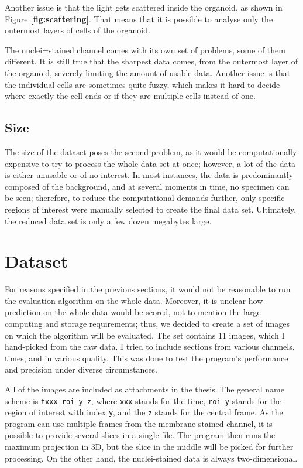 \documentclass[
  digital,     %
  oneside,     %
  nosansbold,  %
  nocolorbold, %
  lof,         %
  lot,         %
]{fithesis4}
\begin{document}
Another issue is that the light gets scattered inside the organoid, as shown
in Figure \textbf{\ref{fig:scattering}}. That means that it is possible to analyse only the
outermost layers of cells of the organoid.

The nuclei=stained channel comes with its own set of problems, some of them different.
It is still true that the sharpest data comes, from the outermost layer
of the organoid, severely limiting the amount of usable data. Another issue is that the
individual cells are sometimes quite fuzzy, which makes it hard to decide where
exactly the cell ends or if they are multiple cells instead of one.

\subsection{Size}

The size of the dataset poses the second problem, as it would be computationally
expensive to try to process the whole data set at once; however, a lot of the
data is either unusable or of no interest. In most instances, the data is
predominantly composed of the background, and at several moments in time, no
specimen can be seen; therefore, to reduce the computational demands further,
only specific regions of interest were manually selected to create the final
data set. Ultimately, the reduced data set is only a few dozen megabytes large.

\section{Dataset}

For reasons specified in the previous sections, it would not be reasonable
to run the evaluation algorithm on the whole data. Moreover, it is unclear
how prediction on the whole data would be scored, not to mention the large
computing and storage requirements; thus, we decided to create a set of images
on which the algorithm will be evaluated. The set contains 11 images, which I
hand-picked from the raw data. I tried to include sections from various
channels, times, and in various quality. This was done to test the
program's performance and precision under diverse circumstances.

All of the images are included as attachments in the thesis. The general
name scheme is \texttt{txxx-roi-y-z}, where \texttt{xxx} stands for the time,
\texttt{roi-y} stands for the region of interest with index \texttt{y}, and the
\texttt{z} stands for the central frame. As the program can use
multiple frames from the membrane-stained channel, it is possible to provide
several slices in a single file. The program then runs the maximum projection
in 3D, but the slice in the middle will be picked for further processing. On the
other hand, the nuclei-stained data is always two-dimensional.
\end{document}
